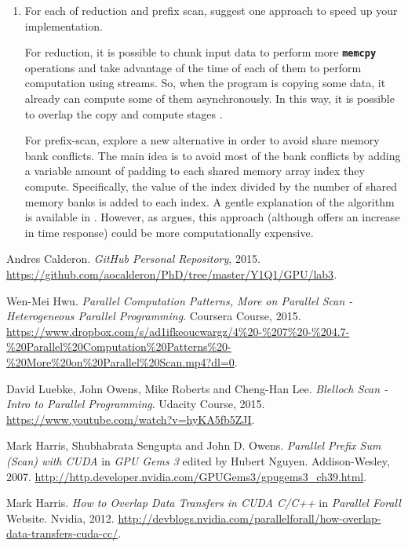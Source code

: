 \documentclass[a4paper,10pt]{scrartcl}
\begin{document}
\begin{enumerate}
 \item For each of reduction and prefix scan, suggest one approach to speed up your implementation.
 
 For reduction, it is possible to chunk input data to perform more \textbf{\texttt{memcpy}} operations and take advantage of the time of each of them to perform computation using streams. So, when the program is copying some data, it already can compute some of them asynchronously.  In this way, it is possible to overlap the copy and compute stages \cite{overlap}.
 
 For prefix-scan, \cite{harris2007} explore a new alternative in order to avoid share memory bank conflicts. The main idea is to avoid most of the bank conflicts by adding a variable amount of padding to each shared memory array index they compute. Specifically, the value of the index divided by the number of shared memory banks is added to each index. A gentle explanation of the algorithm is available in \cite{udacity}.  However, as \cite{hwu2015} argues, this approach (although offers an increase in time response) could be more computationally expensive.
\end{enumerate}

\begin{thebibliography}{9}
Andres Calderon.
\textit{GitHub Personal Repository}, 2015. 
\url{https://github.com/aocalderon/PhD/tree/master/Y1Q1/GPU/lab3}.
 
Wen-Mei Hwu.
\textit{Parallel Computation Patterns, More on Parallel Scan - Heterogeneous Parallel Programming}. 
Coursera Course, 2015. \url{https://www.dropbox.com/s/ad1ifkeoucwargz/4%20-%207%20-%204.7-%20Parallel%20Computation%20Patterns%20-%20More%20on%20Parallel%20Scan.mp4?dl=0}.

David Luebke, John Owens, Mike Roberts and Cheng-Han Lee.
\textit{Blelloch Scan - Intro to Parallel Programming}. 
Udacity Course, 2015. \url{https://www.youtube.com/watch?v=hyKA5fb5ZJI}.

Mark Harris, Shubhabrata Sengupta and John D. Owens.
\textit{Parallel Prefix Sum (Scan) with CUDA} in \textit{GPU Gems 3} edited by Hubert Nguyen. 
Addison-Wesley, 2007.
\url{http://http.developer.nvidia.com/GPUGems3/gpugems3_ch39.html}.

Mark Harris.
\textit{How to Overlap Data Transfers in CUDA C/C++} in \textit{Parallel Forall} Website. Nvidia, 2012.
\url{http://devblogs.nvidia.com/parallelforall/how-overlap-data-transfers-cuda-cc/}.

\end{thebibliography}
\end{document}
